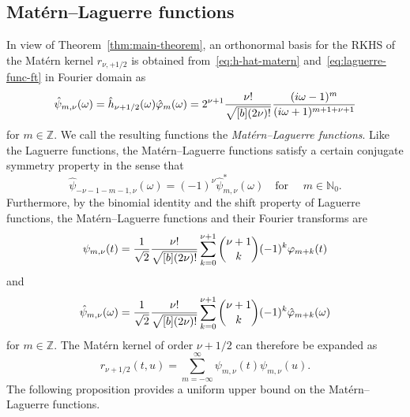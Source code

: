 \documentclass{article}
\newcommand{\tmem}[1]{{\em #1\/}}
\newcommand{\Z}{\mathbb{Z}}
\begin{document}
\subsection{Mat{\'e}rn--Laguerre functions}\label{sec:matern-laguerre}

In view of  Theorem~\ref{thm:main-theorem}, an orthonormal basis for the RKHS
of the Mat{\'e}rn kernel $r_{\nu, + 1 / 2}$ is obtained
from~\eqref{eq:h-hat-matern} and~\eqref{eq:laguerre-func-ft} in Fourier domain
as
\begin{equation}
  \label{eq:matern_laguerre_functions} \hat{\psi}_{m, \nu} (\omega) =
  \hat{h}_{\nu + 1 / 2} (\omega)  \hat{\varphi}_m (\omega) = 2^{\nu + 1} 
  \frac{\nu !}{\sqrt{\smash{[} b] (2 \nu) !}}  \frac{(i \omega - 1)^m}{(i
  \omega + 1)^{m + 1 + \nu + 1}}
\end{equation}
for $m \in \Z$. We call the resulting functions the
{\tmem{Mat{\'e}rn--Laguerre functions}}. Like the Laguerre functions, the
Mat{\'e}rn--Laguerre functions satisfy a certain conjugate symmetry property
in the sense that
\begin{equation}
  \label{eq:matern_laguerre_conjugate_symmetry} \hat{\psi}_{- \nu - 1 - m - 1,
  \nu} (\omega) = (- 1)^{\nu}  \hat{\psi}^{\ast}_{m, \nu} (\omega)  \quad
  \text{for } \quad m \in \mathbb{N}_0 .
\end{equation}
Furthermore, by the binomial identity and the shift property of Laguerre
functions, the Mat{\'e}rn--Laguerre functions and their Fourier transforms are
\begin{equation}
  \label{eq:matern-laguerre-functions} \psi_{m, \nu} (t) = \frac{1}{\sqrt{2}} 
  \frac{\nu !}{\sqrt{\smash{[} b] (2 \nu) !}}  \sum_{k = 0}^{\nu + 1}
  \binom{\nu + 1}{k} (- 1)^k \varphi_{m + k} (t)
\end{equation}
and
\begin{equation}
  \label{eq:matern_laguerre_binomial_expression} \hat{\psi}_{m, \nu} (\omega)
  = \frac{1}{\sqrt{2}}  \frac{\nu !}{\sqrt{\smash{[} b] (2 \nu) !}}  \sum_{k =
  0}^{\nu + 1} \binom{\nu + 1}{k} (- 1)^k  \hat{\varphi}_{m + k} (\omega)
\end{equation}
for $m \in \Z$. The Mat{\'e}rn kernel of order $\nu + 1 / 2$ can therefore be
expanded as
\begin{equation}
  \label{eq:matern-expansion} r_{\nu + 1 / 2} (t, u) = \sum_{m = -
  \infty}^{\infty} \psi_{m, \nu} (t) \psi_{m, \nu} (u) .
\end{equation}
The following proposition provides a uniform upper bound on the
Mat{\'e}rn--Laguerre functions.
\end{document}
